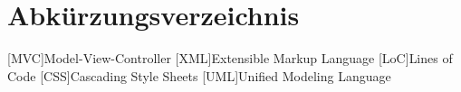\chapter*{Abkürzungsverzeichnis}
\label{abkürzungsverzeichnis}

\begin{acronym}
	[MVC]{Model-View-Controller}
	[XML]{Extensible Markup Language}
	[LoC]{Lines of Code}
	[CSS]{Cascading Style Sheets}
	[UML]{Unified Modeling Language}
\end{acronym}

